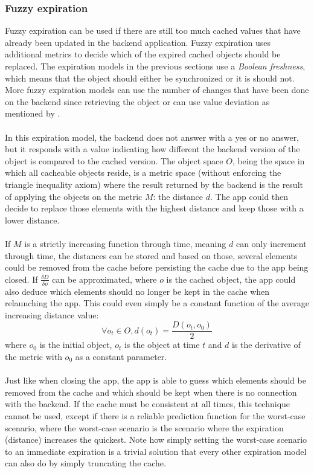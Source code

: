 \documentclass[pdftex,a4paper,12pt,twoside]{report}
\begin{document}
\subsubsection{Fuzzy expiration}
Fuzzy expiration can be used if there are still too much cached values that have already been updated in the backend application. Fuzzy expiration uses additional metrics to decide which of the expired cached objects should be replaced. The expiration models in the previous sections use a \emph{Boolean freshness}, which means that the object should either be synchronized or it is should not. More fuzzy expiration models can use the number of changes that have been done on the backend since retrieving the object or can use value deviation as mentioned by \cite{olston2002best}.
\\\\
In this expiration model, the backend does not answer with a yes or no answer, but it responds with a value indicating how different the backend version of the object is compared to the cached version. The object space $O$, being the space in which all cacheable objects reside, is a metric space (without enforcing the triangle inequality axiom) where the result returned by the backend is the result of applying the objects on the metric $M$: the distance $d$. The app could then decide to replace those elements with the highest distance and keep those with a lower distance.
\\\\
If $M$ is a strictly increasing function through time, meaning $d$ can only increment through time, the distances can be stored and based on those, several elements could be removed from the cache before persisting the cache due to the app being closed. If $\frac{\delta D}{\delta o}$ can be approximated, where $o$ is the cached object, the app could also deduce which elements should no longer be kept in the cache when relaunching the app. This could even simply be a constant function of the average increasing distance value:
\[
\forall o_t \in O, d(o_t) = \frac{D(o_t, o_0)}{2}
\]
where $o_0$ is the initial object, $o_t$ is the object at time $t$ and $d$ is the derivative of the metric with $o_0$ as a constant parameter.
\\\\
Just like when closing the app, the app is able to guess which elements should be removed from the cache and which should be kept when there is no connection with the backend. If the cache must be consistent at all times, this technique cannot be used, except if there is a reliable prediction function for the worst-case scenario, where the worst-case scenario is the scenario where the expiration (distance) increases the quickest. Note how simply setting the worst-case scenario to an immediate expiration is a trivial solution that every other expiration model can also do by simply truncating the cache.
\end{document}
